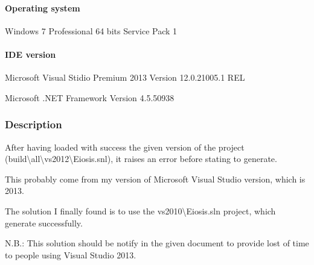 \documentclass[10pt, a4paper]{article}
\begin{document}
\paragraph*{Operating system}
\begin{boxedverbatim}
	Windows 7 Professional 64 bits
	Service Pack 1
\end{boxedverbatim}
\paragraph*{IDE version}
\begin{boxedverbatim}
	Microsoft Visual Stidio Premium 2013
	Version 12.0.21005.1 REL
	
	Microsoft .NET Framework
	Version 4.5.50938
\end{boxedverbatim}

\subsubsection*{Description}

After having loaded with success the given version of the project (build\textbackslash all\textbackslash vs2012\textbackslash Eiosis.snl), it raises an error before stating to generate.

This probably come from my version of Microsoft Visual Studio version, which is 2013.

The solution I finally found is to use the vs2010\textbackslash Eiosis.sln project, which generate successfully.

\bigskip
N.B.: This solution should be notify in the given document to provide lost of time to people using Visual Studio 2013. 
\end{document}
